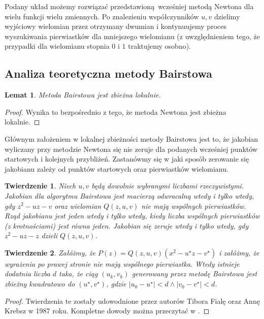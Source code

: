 \documentclass{article}
\newtheorem{thm}{Twierdzenie}
\newtheorem{lemat}{Lemat}
\begin{document}
Podany układ możemy rozwiązać przedstawioną wcześniej metodą Newtona dla wielu funkcji wielu zmiennych. Po znalezieniu współczynników $u, v$ dzielimy wyjściowy wielomian przez otrzymany dwumian i kontynuujemy proces wyszukiwania pierwiastków dla mniejszego wielomianu (z uwzględnieniem tego, że przypadki dla wielomianu stopnia $0$ i $1$ traktujemy osobno).

\subsection{Analiza teoretyczna metody Bairstowa}

\begin{lemat}
Metoda Bairstowa jest zbieżna lokalnie.	
\end{lemat}

\begin{proof}
Wynika to bezpośrednio z tego, że metoda Newtona jest zbieżna lokalnie.	
\end{proof}

Głównym założeniem w lokalnej zbieżności metody Bairstowa jest to, że jakobian wyliczany przy metodzie Newtona się nie zeruje dla podanych wcześniej punktów startowych i kolejnych przybliżeń. Zastanówmy się w jaki sposób zerowanie się jakobianu zależy od punktów startowych oraz pierwiastków wielomianu.

\begin{thm}
Niech $u, v$ będą dowolnie wybranymi liczbami rzeczywistymi. Jakobian dla algorytmu Bairstowa jest macierzą odwracalną wtedy i tylko wtedy, gdy $z^2 - uz - v$ oraz wielomian $Q(z,u,v)$ nie mają wspólnych pierwiastków. Rząd jakobianu jest jeden wtedy i tylko wtedy, kiedy liczba wspólnych pierwiastków (z krotnościami) jest równa jeden. Jakobian się zeruje wtedy i tylko wtedy, gdy $z^2 - uz - z$ dzieli $Q(z,u,v)$.
\end{thm}

\begin{thm}
Załóżmy, że $P(z) = Q(z, u, v) (x^2 - u^{\star} z - v^{\star})$ i załóżmy, że wyrażenia po prawej stronie nie mają wspólnego pierwiastka. Wtedy istnieje dodatnia liczba $d$ taka, że ciąg $(u_k, v_k)$ generowany przez metodę Bairstowa jest zbieżny kwadratowo do $(u^{\star}, v^{\star})$, gdzie $|u_0 - u^{\star}| < d \wedge |v_0 - v^{\star}| < d$. 
\end{thm}

\begin{proof}
Twierdzenia te zostały udowodnione przez autorów Tibora Fialę oraz Annę Krebsz w 1987 roku. Kompletne dowody można przeczytać w \cite{krebsz}.
\end{proof}
\end{document}
